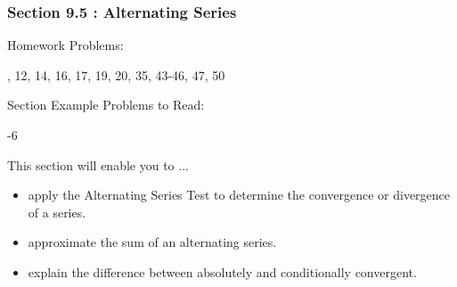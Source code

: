 %
%

\begin{frame}
\frametitle{\Large {\color[rgb]{0.02,0.20,1.0} Section 9.5 : Alternating Series}}
\vspace{0.8cm}
\scriptsize
\begin{block}{Homework Problems:}

\vspace{0.2cm}
, 12, 14, 16, 17, 19, 20, 35, 43-46, 47, 50
	
\end{block}
\vspace{0.5cm}

\begin{block}{Section Example Problems to Read:}

\vspace{0.2cm}
-6
	
\end{block}
\vspace{0.2cm}

\begin{block}{This section will enable you to ...}
\begin{itemize}
	\item[...] apply the Alternating Series Test to determine the convergence or divergence of a series.
	\item[...] approximate the sum of an alternating series.
	\item[...] explain the difference between absolutely and conditionally convergent.
\end{itemize}
\end{block}
\vspace{3.0cm}
\end{frame}

